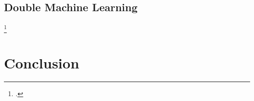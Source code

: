     \section{Double Machine Learning}
    \blindtext\footcite[see][1]{voli2020}
\clearpage
\chapter{Conclusion}
    \blindtext
\clearpage